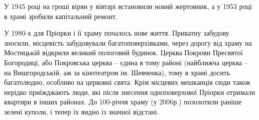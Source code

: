 У 1945 році на гроші вірян у вівтарі встановили новий жертовник, а у 1953 році
в храмі зробили капітальний ремонт.

У 1980-х для Пріорки і її храму почалось нове життя. Приватну забудову зносили,
місцевість забудовували багатоповерхівками, через дорогу від храму на
Мостицькій відкрили великий пологовий будинок. Церква Покрови Пресвятої
Богородиці, або Покровська церква – єдина в тому районі (найближча церква – на
Вишгородській, аж за кінотеатром ім. Шевченка), тому в храмі досить багатолюдно,
особливо на церковні свята. Крім місцевих мешканців сюди також нерідко
приїжджають люди, які після знесення одноповерхової Пріорки отримали квартири в
інших районах. До 100-річчя храму (у 2006р.) позолотили раніше зелені куполи, і
тепер їх видно із значної відстані.
